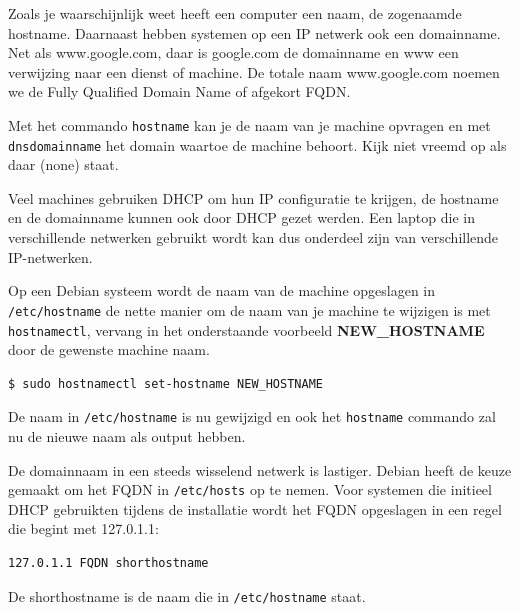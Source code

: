 Zoals je waarschijnlijk weet heeft een computer een naam, de zogenaamde hostname. Daarnaast hebben systemen op een IP netwerk ook een domainname. Net als www.google.com, daar is google.com de domainname en www een verwijzing naar een dienst of machine. De totale naam www.google.com noemen we de Fully Qualified Domain Name of afgekort FQDN.

Met het commando \texttt{hostname} kan je de naam van je machine opvragen en met \texttt{dnsdomainname} het domain waartoe de machine behoort. Kijk niet vreemd op als daar (none) staat.

Veel machines gebruiken DHCP om hun IP configuratie te krijgen, de hostname en de domainname kunnen ook door DHCP gezet werden. Een laptop die in verschillende netwerken gebruikt wordt kan dus onderdeel zijn van verschillende IP-netwerken.

Op een Debian systeem wordt de naam van de machine opgeslagen in \texttt{/etc/hostname} de nette manier om de naam van je machine te wijzigen is met \texttt{hostnamectl}, vervang in het onderstaande voorbeeld \textbf{NEW\_HOSTNAME} door de gewenste machine naam.
\begin{lstlisting}
$ sudo hostnamectl set-hostname NEW_HOSTNAME
\end{lstlisting}
De naam in \texttt{/etc/hostname} is nu gewijzigd en ook het \texttt{hostname} commando zal nu de nieuwe naam als output hebben.

De domainnaam in een steeds wisselend netwerk is lastiger. Debian heeft de keuze gemaakt om het FQDN in \texttt{/etc/hosts} op te nemen. Voor systemen die initieel DHCP gebruikten tijdens de installatie wordt het FQDN opgeslagen in een regel die begint met 127.0.1.1:
\begin{lstlisting}
127.0.1.1 FQDN shorthostname
\end{lstlisting}
De shorthostname is de naam die in \texttt{/etc/hostname} staat.

